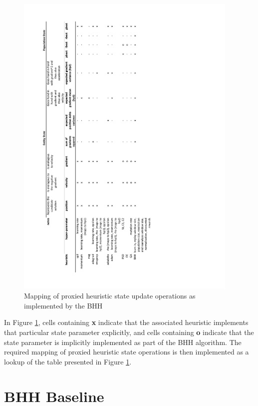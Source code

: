 \begin{figure}[htbp]
      \centering
      \includegraphics[width=0.95\textwidth]{images/bhh_heuristic_proxies.pdf}
      \caption{Mapping of proxied heuristic state update operations as implemented by the \acs{BHH}}
      \label{fig:methodology:heuristics:proxies}%
\end{figure}


In Figure \ref{fig:methodology:heuristics:proxies}, cells containing \textbf{x} indicate that the associated heuristic implements that particular state parameter explicitly, and cells containing \textbf{o} indicate that the state parameter is implicitly implemented as part of the \acs{BHH} algorithm. The required mapping of proxied heuristic state operations is then implemented as a lookup of the table presented in Figure \ref{fig:methodology:heuristics:proxies}.

\section{BHH Baseline}\label{sec:methodology:baseline_bhh}

